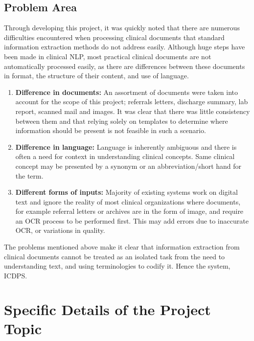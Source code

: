 \subsection{Problem Area}

Through developing this project, it was quickly noted that there are numerous difficulties encountered when processing clinical documents that standard information extraction methods do not address easily. Although huge steps have been made in clinical NLP, most practical clinical documents are not automatically processed easily, as there are differences between these documents in format, the structure of their content, and use of language.

\begin{enumerate}
    \item \textbf{Difference in documents:} An assortment of documents were taken into account for the scope of this project; referrals letters, discharge summary, lab report, scanned mail and images. It was clear that there was little consistency between them and that relying solely on templates to determine where information should be present is not feasible in such a scenario.

    \item \textbf{Difference in language:} Language is inherently ambiguous and there is often a need for context in understanding clinical concepts. Same clinical concept may be presented by a synonym or an abbreviation/short hand for the term.

    \item \textbf{Different forms of inputs:} Majority of existing systems work on digital text and ignore the reality of most clinical organizations where documents, for example referral letters or archives are in the form of image, and require an OCR process to be performed first. This may add errors due to inaccurate OCR, or variations in quality.
\end{enumerate}

The problems mentioned above make it clear that information extraction from clinical documents cannot be treated as an isolated task from the need to understanding text, and using terminologies to codify it. Hence the system, ICDPS.

\section{Specific Details of the Project Topic}

